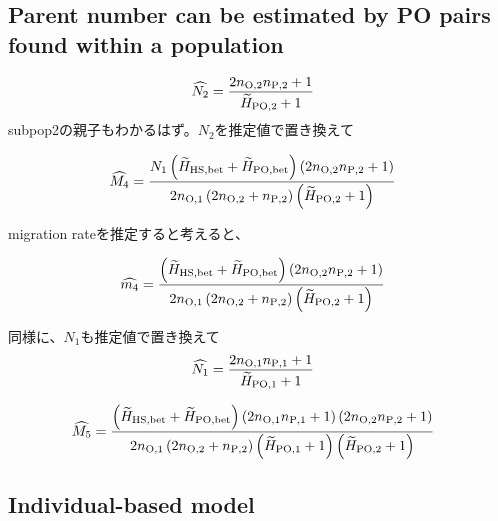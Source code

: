 \documentclass[12pt, English]{article}
\begin{document}
\begin{spacing}{1.9}
\subsection{Parent number can be estimated by PO pairs found within a population}

\begin{align}
\widehat{N_2} &= \frac{ 2 n_{\rm O, 2} n_{\rm P, 2} + 1 }{\widetilde{H}_{\rm PO, 2} + 1} 
\label{AP-3}
\end{align}
subpop2の親子もわかるはず。$N_2$を推定値で置き換えて

\begin{align}
\widehat{M_4} &=  \frac{ N_{1} \left(\widetilde{H}_{\rm HS,bet} + \widetilde{H}_{\rm PO,bet}\right) \left(2 n_{\rm O, 2} n_{\rm P, 2} + 1\right)} {2n_{\rm O, 1} \left(2 n_{\rm O, 2} + n_{\rm P, 2}\right) \left(\widetilde{H}_{\rm PO, 2} + 1\right)}
\label{AP-4}
\end{align}

migration rateを推定すると考えると、

\begin{align}
\widehat{m_4} &=  \frac{ \left(\widetilde{H}_{\rm HS,bet} + \widetilde{H}_{\rm PO,bet}\right) \left(2 n_{\rm O, 2} n_{\rm P, 2} + 1\right)} {2n_{\rm O, 1} \left(2 n_{\rm O, 2} + n_{\rm P, 2}\right) \left(\widetilde{H}_{\rm PO, 2} + 1\right)}
\label{AP-5}
\end{align}

同様に、$N_1$も推定値で置き換えて
\begin{align}
\widehat{N_1} &= \frac{ 2 n_{\rm O, 1} n_{\rm P, 1} + 1 }{\widetilde{H}_{\rm PO, 1} + 1} 
\label{AP-6}
\end{align}

\begin{align}
\widehat{M_5} &=  \frac{ \left(\widetilde{H}_{\rm HS,bet} + \widetilde{H}_{\rm PO,bet}\right) \left(2 n_{\rm O, 1} n_{\rm P, 1} + 1\right) \left(2 n_{\rm O, 2} n_{\rm P, 2} + 1\right)} {2n_{\rm O, 1} \left(2 n_{\rm O, 2} + n_{\rm P, 2}\right) \left(\widetilde{H}_{\rm PO, 1} + 1\right) \left(\widetilde{H}_{\rm PO, 2} + 1\right)}
\label{AP-7}
\end{align}

\subsection{Individual-based model}











\end{spacing}
\end{document}
